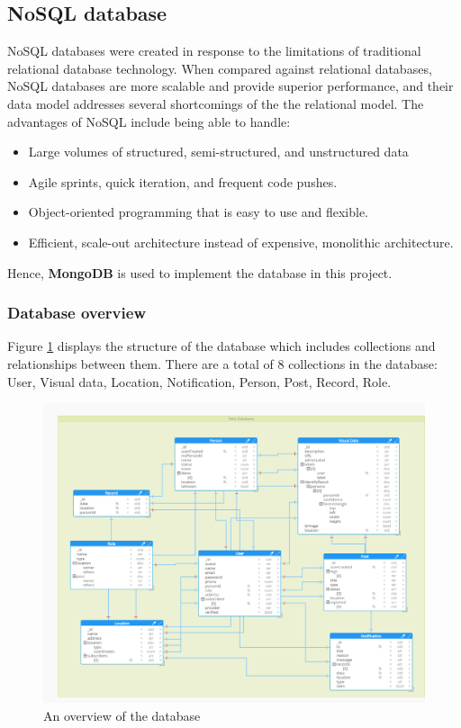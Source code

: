 \subsection{NoSQL database}
NoSQL databases were created in response to the limitations of traditional relational database technology. When compared against relational databases, NoSQL databases are more scalable and provide superior performance, and their data model addresses several shortcomings of the the relational model.
The advantages of NoSQL include being able to handle:
\begin{itemize}
\item Large volumes of structured, semi-structured, and unstructured data
\item Agile sprints, quick iteration, and frequent code pushes.
\item Object-oriented programming that is easy to use and flexible.
\item Efficient, scale-out architecture instead of expensive, monolithic architecture.
\end{itemize}
Hence, \textbf{MongoDB} is used to implement the database in this project.
\subsubsection{Database overview}
Figure \ref{chap4:database_overview} displays the structure of the database which includes collections and relationships between them.
There are a total of 8 collections in the database: User, Visual data, Location, Notification, Person, Post, Record, Role. 
\begin{center}
	\begin{figure}[H]
		\centering
		\includegraphics[width=1\columnwidth]{images/chap4/Model.png}
		\caption{An overview of the database}
		\label{chap4:database_overview}
	\end{figure}
\end{center}
\cleardoublepage
